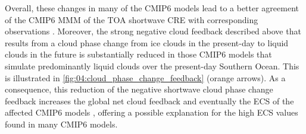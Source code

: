 Overall, these changes in many of the \acs{CMIP}6 models lead to a better
agreement of the \acs{CMIP}6 \ac{MMM} of the \ac{TOA} shortwave \ac{CRE} with
corresponding observations \autocite{Bock2020}. Moreover, the strong negative
cloud feedback described above that results from a cloud phase change from ice
clouds in the present-day to liquid clouds in the future is substantially
reduced in those \acs{CMIP}6 models that simulate predominantly liquid clouds
over the present-day Southern Ocean. This is illustrated in
\cref{fig:04:cloud_phase_change_feedback} (orange arrows). As a consequence,
this reduction of the negative shortwave cloud phase change feedback increases
the global net cloud feedback \autocite{BodasSalcedo2019, Tan2016} and
eventually the \ac{ECS} of the affected \acs{CMIP}6 models
\autocite{Andrews2019, Gettelman2019}, offering a possible explanation for the
high \ac{ECS} values found in many \acs{CMIP}6 models.

